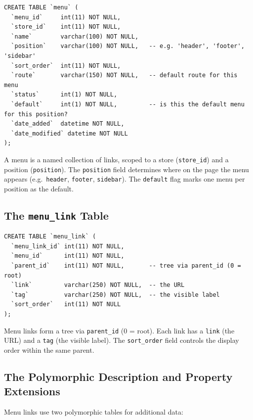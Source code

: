 \documentclass[11pt,a4paper]{article}
\begin{document}
\begin{lstlisting}[caption={The \texttt{menu} table schema.},label={lst:menu-schema}]
CREATE TABLE `menu` (
  `menu_id`     int(11) NOT NULL,
  `store_id`    int(11) NOT NULL,
  `name`        varchar(100) NOT NULL,
  `position`    varchar(100) NOT NULL,   -- e.g. 'header', 'footer', 'sidebar'
  `sort_order`  int(11) NOT NULL,
  `route`       varchar(150) NOT NULL,   -- default route for this menu
  `status`      int(1) NOT NULL,
  `default`     int(1) NOT NULL,         -- is this the default menu for this position?
  `date_added`  datetime NOT NULL,
  `date_modified` datetime NOT NULL
);
\end{lstlisting}

A menu is a named collection of links, scoped to a store
(\texttt{store\_id}) and a position (\texttt{position}). The
\texttt{position} field determines where on the page the menu appears
(e.g.\ \texttt{header}, \texttt{footer}, \texttt{sidebar}). The
\texttt{default} flag marks one menu per position as the default.

\subsection{The \texttt{menu\_link} Table}

\begin{lstlisting}[caption={The \texttt{menu\_link} table schema.},label={lst:menu-link-schema}]
CREATE TABLE `menu_link` (
  `menu_link_id` int(11) NOT NULL,
  `menu_id`      int(11) NOT NULL,
  `parent_id`    int(11) NOT NULL,       -- tree via parent_id (0 = root)
  `link`         varchar(250) NOT NULL,  -- the URL
  `tag`          varchar(250) NOT NULL,  -- the visible label
  `sort_order`   int(11) NOT NULL
);
\end{lstlisting}

Menu links form a tree via \texttt{parent\_id} (0 = root). Each link
has a \texttt{link} (the URL) and a \texttt{tag} (the visible label).
The \texttt{sort\_order} field controls the display order within the
same parent.

\subsection{The Polymorphic Description and Property Extensions}

Menu links use two polymorphic tables for additional data:
\end{document}
